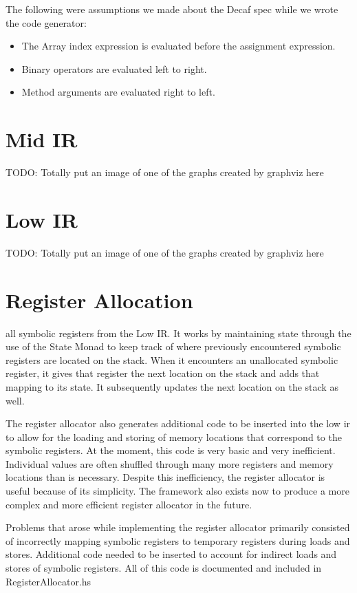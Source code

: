\documentclass[11pt]{article}
\begin{document}
The following were assumptions we made about the Decaf spec while we
wrote the code generator: 

\begin{itemize}
\item The Array index expression is evaluated before the assignment expression. 
\item Binary operators are evaluated left to right. 
\item Method arguments are evaluated right to left. 
\end{itemize}

\section {Mid IR}
\label{sec:midir}

TODO: Totally put an image of one of the graphs created by graphviz here 

\section {Low IR} 
\label{sec:lowir}

TODO: Totally put an image of one of the graphs created by graphviz here 

\section {Register Allocation} 
\label{sec:regalloc}

all symbolic registers from the Low IR. It works by maintaining state
through the use of the State Monad to keep track of where previously
encountered symbolic registers are located on the stack. When it
encounters an unallocated symbolic register, it gives that register
the next location on the stack and adds that mapping to its state. It
subsequently updates the next location on the stack as well. 

The register allocator also generates additional code to be inserted
into the low ir to allow for the loading and storing of memory
locations that correspond to the symbolic registers. At the moment,
this code is very basic and very inefficient. Individual values are
often shuffled through many more registers and memory locations than is
necessary. Despite this inefficiency, the register allocator is useful
because of its simplicity. The framework also exists now to produce a
more complex and more efficient register allocator in the future. 

Problems that arose while implementing the register allocator
primarily consisted of incorrectly mapping symbolic registers to
temporary registers during loads and stores. Additional code needed to
be inserted to account for indirect loads and stores of symbolic
registers. All of this code is documented and included in RegisterAllocator.hs
\end{document}
